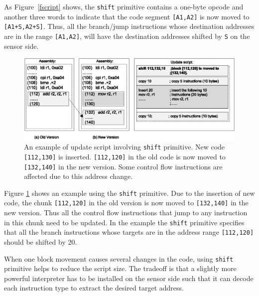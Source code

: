 As Figure~\ref{fscript} shows, the {\tt shift} primitive contains a one-byte opcode and another three words to indicate that
the code segment {\tt [A1,A2]} is now moved to {\tt [A1+S,A2+S]}. Thus, all the branch/jump instructions whose destination addresses are in the range {\tt [A1,A2]}, will have the destination addresses shifted by {\tt S} on the sensor side.


\begin{figure}[htbp]
\centering
\includegraphics[width=6in]{figures/shift.eps}
\caption{An example of update script involving {\tt shift} primitive. New code {\tt [112,130]} is inserted. {\tt [112,120]} in the old code is now moved to {\tt [132,140]} 
in the new version. Some control flow instructions are affected due to this address change.
}
\label{fshift}
\end{figure}

Figure \ref{fshift} shows an example using the {\tt shift} primitive. Due to the insertion of
new code, the chunk {\tt [112,120]} in the old version is now moved to {\tt [132,140]} 
in the new version. Thus all the control flow instructions that
jump to any instruction in this chunk need to be updated. In the example the {\tt shift} primitive
specifies that all the branch instructions whose targets are in the address range {\tt [112,120]} should be shifted by 20. 

When one block movement causes several changes in the code, using {\tt shift} primitive helps to reduce the script size. The tradeoff is that a slightly more powerful interpreter has to be installed on the sensor side such that it can decode each instruction type to extract the desired target address. 

